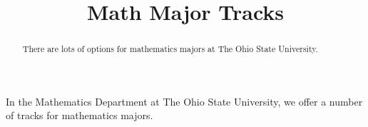 \documentclass[handout,nooutcomes,space]{ximera}
\title{Math Major Tracks}
\begin{document}
\begin{abstract}
There are lots of options for mathematics majors at The Ohio State University. 
\end{abstract}
\maketitle

In the Mathematics Department at The Ohio State University, we offer a
number of tracks for mathematics majors.

% 
% 
% 
% 
\end{document}

